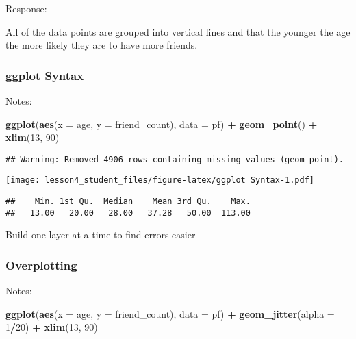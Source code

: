 \documentclass[]{article}
\newenvironment{Shaded}{\begin{snugshade}}{\end{snugshade}}
\newcommand{\KeywordTok}[1]{\textcolor[rgb]{0.13,0.29,0.53}{\textbf{#1}}}
\newcommand{\DataTypeTok}[1]{\textcolor[rgb]{0.13,0.29,0.53}{#1}}
\newcommand{\DecValTok}[1]{\textcolor[rgb]{0.00,0.00,0.81}{#1}}
\newcommand{\StringTok}[1]{\textcolor[rgb]{0.31,0.60,0.02}{#1}}
\newcommand{\OperatorTok}[1]{\textcolor[rgb]{0.81,0.36,0.00}{\textbf{#1}}}
\newcommand{\NormalTok}[1]{#1}
\begin{document}
Response:

All of the data points are grouped into vertical lines and that the
younger the age the more likely they are to have more friends.

\subsubsection{ggplot Syntax}\label{ggplot-syntax}

Notes:

\begin{Shaded}
\begin{Highlighting}[]
\KeywordTok{ggplot}\NormalTok{(}\KeywordTok{aes}\NormalTok{(}\DataTypeTok{x =}\NormalTok{ age, }\DataTypeTok{y =}\NormalTok{ friend_count), }\DataTypeTok{data =}\NormalTok{ pf) }\OperatorTok{+}
\StringTok{  }\KeywordTok{geom_point}\NormalTok{() }\OperatorTok{+}
\StringTok{  }\KeywordTok{xlim}\NormalTok{(}\DecValTok{13}\NormalTok{, }\DecValTok{90}\NormalTok{)}
\end{Highlighting}
\end{Shaded}

\begin{verbatim}
## Warning: Removed 4906 rows containing missing values (geom_point).
\end{verbatim}

\texttt{[image: lesson4\_student\_files/figure-latex/ggplot Syntax-1.pdf]}

\begin{Shaded}
\end{Shaded}

\begin{verbatim}
##    Min. 1st Qu.  Median    Mean 3rd Qu.    Max. 
##   13.00   20.00   28.00   37.28   50.00  113.00
\end{verbatim}

Build one layer at a time to find errors easier

\subsubsection{Overplotting}\label{overplotting}

Notes:

\begin{Shaded}
\begin{Highlighting}[]
\KeywordTok{ggplot}\NormalTok{(}\KeywordTok{aes}\NormalTok{(}\DataTypeTok{x =}\NormalTok{ age, }\DataTypeTok{y =}\NormalTok{ friend_count), }\DataTypeTok{data =}\NormalTok{ pf) }\OperatorTok{+}
\StringTok{  }\KeywordTok{geom_jitter}\NormalTok{(}\DataTypeTok{alpha =} \DecValTok{1}\OperatorTok{/}\DecValTok{20}\NormalTok{) }\OperatorTok{+}
\StringTok{  }\KeywordTok{xlim}\NormalTok{(}\DecValTok{13}\NormalTok{, }\DecValTok{90}\NormalTok{)}
\end{Highlighting}
\end{Shaded}
\end{document}
